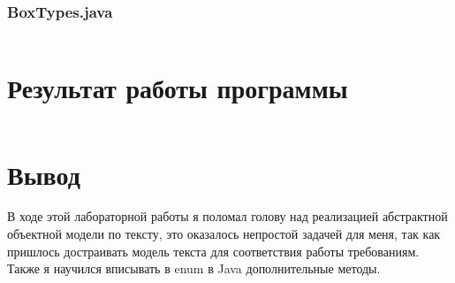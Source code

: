 \documentclass[11pt]{article}
\begin{document}
\subsubsection{BoxTypes.java}
\inputminted[linenos]{java}{../prog3lab/src/main/java/com/kupp/prog3lab/BoxTypes.java}
\section{Результат работы программы}
\inputminted{text}{../out.txt}
\section{Вывод}
\large
В ходе этой лабораторной работы я поломал голову над реализацией абстрактной объектной модели по тексту, это оказалось непростой задачей для меня, так как пришлось достраивать модель текста для соответствия работы требованиям. Также я научился вписывать в enum в Java дополнительные методы.
\end{document}
